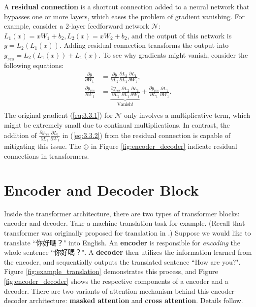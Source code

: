 A \textbf{residual connection} is a shortcut connection added to a neural network that bypasses one or more layers, which eases the problem of gradient vanishing. For example, consider a 2-layer feedforward network $\mathcal{N}$: $L_1(x) = xW_1 + b_2, L_2(x) = xW_2 + b_2$, and the output of this network is $y = L_2(L_1(x))$. Adding residual connection transforms the output into $y_{res} = L_2(L_1(x)) + L_1(x)$. To see why gradients might vanish, consider the following equations:
\begin{align*}
  \frac{\partial y}{\partial W_1} &= \frac {\partial y}{\partial L_2} \frac {\partial L_2}{\partial L_1} \frac {\partial L_1}{\partial W_1}, \tag{*} \label{eq:3.3.1} \\
  \frac{\partial y_{res}}{\partial W_1} &= \underbrace{\frac {\partial y_{res}}{\partial L_2} \frac {\partial L_2}{\partial L_1} \frac {\partial L_1}{\partial W_1}}_{\text{Vanish!}} + \frac {\partial y_{res}}{\partial L_1} \frac {\partial L_1}{\partial W_1}. \tag{**}\label{eq:3.3.2} \\
\end{align*}    
The original gradient (\ref{eq:3.3.1}) for $\mathcal{N}$ only involves a multiplicative term, which might be extremely small due to continual multiplications. In contrast, the addition of $\frac{\partial y_{res}}{\partial L_1} \frac {\partial L_1}{\partial W_1}$ in (\ref{eq:3.3.2}) from the residual connection is capable of mitigating this issue. The $\oplus$ in Figure \ref{fig:encoder_decoder} indicate residual connections in transformers.

\section{Encoder and Decoder Block} \label{sec:encoder_decoder}

\begin{CJK*}{UTF8}{bkai}
Inside the transformer architecture, there are two types of transformer blocks: encoder and decoder. Take a machine translation task for example. (Recall that transformer was originally proposed for translation in \cite{vaswani2017attention}.) Suppose we would like to translate ``你好嗎？" into English. An \textbf{encoder} is responsible for \textit{encoding} the whole 
sentence ``你好嗎？". A \textbf{decoder} then utilizes the information learned from the encoder, and 
sequentially outputs the translated sentence ``How are you?". Figure \ref{fig:example_translation} demonstrates this process, and Figure \ref{fig:encoder_decoder} shows the respective components of a encoder and a decoder. There are two variants of attention mechanism behind this encoder-decoder architecture: \textbf{masked attention} and \textbf{cross attention}. Details follow.
\end{CJK*}

